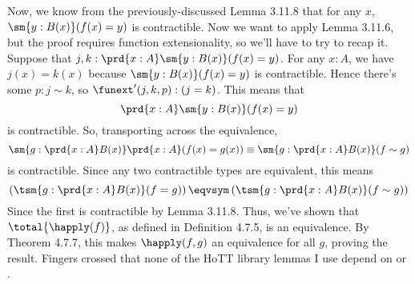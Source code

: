 Now, we know from the previously-discussed Lemma 3.11.8 that for any $x$,
$\sm{y:B(x)} (f(x) = y)$ is contractible.  Now we want to apply Lemma 3.11.6,
but the proof requires function extensionality, so we'll have to try to recap
it.  Suppose that $j, k : \prd{x:A}\sm{y:B(x)}(f(x)=y)$.  For any $x : A$, we
have $j(x) = k(x)$ because $\sm{y:B(x)}(f(x) = y)$ is contractible.  Hence
there's some $p: j \sim k$, so $\funext'(j, k, p) : (j=k)$.  This means that
\[
  \prd{x:A}\sm{y:B(x)} (f(x) = y)
\]
is contractible.  So, transporting across the equivalence,
\[
  \sm{g:\prd{x:A}B(x)}\prd{x:A}(f(x) = g(x))
  \equiv
  \sm{g:\prd{x:A}B(x)}(f \sim g)
\]
is contractible.  Since any two contractible types are equivalent, this means
\[
  \left(\tsm{g:\prd{x:A}B(x)} (f=g)\right)   
  \eqvsym
  \left(\tsm{g:\prd{x:A}B(x)} (f \sim g)\right)   
\]
Since the first is contractible by Lemma 3.11.8.  Thus, we've shown
that $\total{\happly(f)}$, as defined in Definition 4.7.5, is an
equivalence.  By Theorem 4.7.7, this makes $\happly(f, g)$ an
equivalence for all $g$, proving the result.  Fingers crossed that none of the
HoTT library lemmas I use depend on  or .
